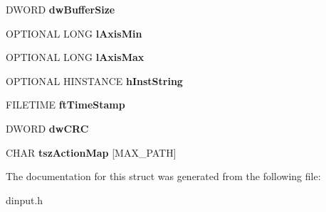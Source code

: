 \begin{DoxyCompactItemize}
\item 
\hypertarget{struct___d_i_a_c_t_i_o_n_f_o_r_m_a_t_a_a65954d3636d2d0d54e2422f0f162fe94}{D\-W\-O\-R\-D {\bfseries dw\-Buffer\-Size}}\label{struct___d_i_a_c_t_i_o_n_f_o_r_m_a_t_a_a65954d3636d2d0d54e2422f0f162fe94}

\item 
\hypertarget{struct___d_i_a_c_t_i_o_n_f_o_r_m_a_t_a_ad648aa595610f5b34f4087942ddc8c36}{O\-P\-T\-I\-O\-N\-A\-L L\-O\-N\-G {\bfseries l\-Axis\-Min}}\label{struct___d_i_a_c_t_i_o_n_f_o_r_m_a_t_a_ad648aa595610f5b34f4087942ddc8c36}

\item 
\hypertarget{struct___d_i_a_c_t_i_o_n_f_o_r_m_a_t_a_a3ed93dda9bc4a9baec1f2239bc0b5c49}{O\-P\-T\-I\-O\-N\-A\-L L\-O\-N\-G {\bfseries l\-Axis\-Max}}\label{struct___d_i_a_c_t_i_o_n_f_o_r_m_a_t_a_a3ed93dda9bc4a9baec1f2239bc0b5c49}

\item 
\hypertarget{struct___d_i_a_c_t_i_o_n_f_o_r_m_a_t_a_a7f2541de638f51d2e2e4bda54f86f30d}{O\-P\-T\-I\-O\-N\-A\-L H\-I\-N\-S\-T\-A\-N\-C\-E {\bfseries h\-Inst\-String}}\label{struct___d_i_a_c_t_i_o_n_f_o_r_m_a_t_a_a7f2541de638f51d2e2e4bda54f86f30d}

\item 
\hypertarget{struct___d_i_a_c_t_i_o_n_f_o_r_m_a_t_a_a7fbb2e0c7efa734830800a50f40b1ea4}{F\-I\-L\-E\-T\-I\-M\-E {\bfseries ft\-Time\-Stamp}}\label{struct___d_i_a_c_t_i_o_n_f_o_r_m_a_t_a_a7fbb2e0c7efa734830800a50f40b1ea4}

\item 
\hypertarget{struct___d_i_a_c_t_i_o_n_f_o_r_m_a_t_a_a49b9f5d5cffa2c0855718895fd102e2c}{D\-W\-O\-R\-D {\bfseries dw\-C\-R\-C}}\label{struct___d_i_a_c_t_i_o_n_f_o_r_m_a_t_a_a49b9f5d5cffa2c0855718895fd102e2c}

\item 
\hypertarget{struct___d_i_a_c_t_i_o_n_f_o_r_m_a_t_a_a2efdc83a66f71becae94af27bb5b2e0a}{C\-H\-A\-R {\bfseries tsz\-Action\-Map} \mbox{[}M\-A\-X\-\_\-\-P\-A\-T\-H\mbox{]}}\label{struct___d_i_a_c_t_i_o_n_f_o_r_m_a_t_a_a2efdc83a66f71becae94af27bb5b2e0a}

\end{DoxyCompactItemize}


The documentation for this struct was generated from the following file\-:\begin{DoxyCompactItemize}
\item 
dinput.\-h\end{DoxyCompactItemize}
